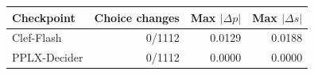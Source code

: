 \begin{tabular}{lrrr}
\toprule
Checkpoint & Choice changes & Max $|\Delta p|$ & Max $|\Delta s|$ \\
\midrule
Clef-Flash & 0/1112 & 0.0129 & 0.0188 \\
PPLX-Decider & 0/1112 & 0.0000 & 0.0000 \\
\bottomrule
\end{tabular}
